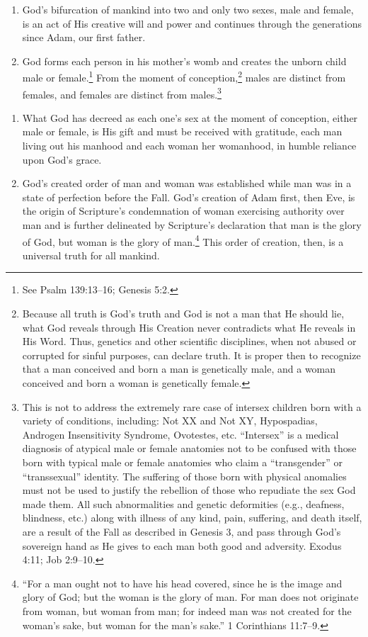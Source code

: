 \documentclass[
]{book}
\providecommand{\tightlist}{%
  \setlength{\itemsep}{0pt}\setlength{\parskip}{0pt}}
\begin{document}
\begin{enumerate}
\def\labelenumi{\arabic{enumi}.}
\setcounter{enumi}{2}
\tightlist
\item
  God's bifurcation of mankind into two and only two sexes, male and female, is an act of His creative will and power and continues through the generations since Adam, our first father.
\item
  God forms each person in his mother's womb and creates the unborn child male or female.\footnote{See Psalm 139:13--16; Genesis 5:2.} From the moment of conception,\footnote{Because all truth is God's truth and God is not a man that He should lie, what God reveals through His Creation never contradicts what He reveals in His Word. Thus, genetics and other scientific disciplines, when not abused or corrupted for sinful purposes, can declare truth. It is proper then to recognize that a man conceived and born a man is genetically male, and a woman conceived and born a woman is genetically female.} males are distinct from females, and females are distinct from males.\footnote{This is not to address the extremely rare case of intersex children born with a variety of conditions, including: Not XX and Not XY, Hypospadias, Androgen Insensitivity Syndrome, Ovotestes, etc. ``Intersex'' is a medical diagnosis of atypical male or female anatomies not to be confused with those born with typical male or female anatomies who claim a ``transgender'' or ``transsexual'' identity. The suffering of those born with physical anomalies must not be used to justify the rebellion of those who repudiate the sex God made them. All such abnormalities and genetic deformities (e.g., deafness, blindness, etc.) along with illness of any kind, pain, suffering, and death itself, are a result of the Fall as described in Genesis 3, and pass through God's sovereign hand as He gives to each man both good and adversity. Exodus 4:11; Job 2:9--10.}
\end{enumerate}

\begin{enumerate}
\def\labelenumi{\arabic{enumi}.}
\setcounter{enumi}{4}
\tightlist
\item
  What God has decreed as each one's sex at the moment of conception, either male or female, is His gift and must be received with gratitude, each man living out his manhood and each woman her womanhood, in humble reliance upon God's grace.
\item
  God's created order of man and woman was established while man was in a state of perfection before the Fall. God's creation of Adam first, then Eve, is the origin of Scripture's condemnation of woman exercising authority over man and is further delineated by Scripture's declaration that man is the glory of God, but woman is the glory of man.\footnote{``For a man ought not to have his head covered, since he is the image and glory of God; but the woman is the glory of man. For man does not originate from woman, but woman from man; for indeed man was not created for the woman's sake, but woman for the man's sake.'' 1 Corinthians 11:7--9.} This order of creation, then, is a universal truth for all mankind.
\end{enumerate}
\end{document}
